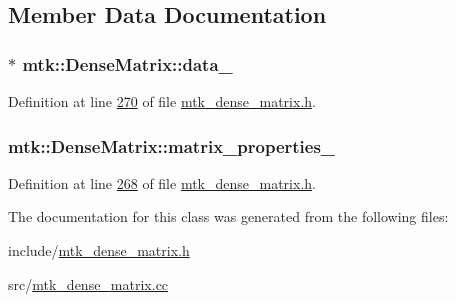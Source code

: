 \subsection{Member Data Documentation}
\hypertarget{classmtk_1_1DenseMatrix_a7893e4e5c8d2e2de32b156177e78cb6f}{
\subsubsection[{data\-\_\-}]{$\ast$ mtk\-::\-Dense\-Matrix\-::data\-\_\-\hspace{0.3cm}{\ttfamily [private]}}}\label{classmtk_1_1DenseMatrix_a7893e4e5c8d2e2de32b156177e78cb6f}


Definition at line \hyperlink{mtk__dense__matrix_8h_source_l00270}{270} of file \hyperlink{mtk__dense__matrix_8h_source}{mtk\-\_\-dense\-\_\-matrix.\-h}.

\hypertarget{classmtk_1_1DenseMatrix_a481c8d09af685a5ba67acefdcaa810cc}{
\subsubsection[{matrix\-\_\-properties\-\_\-}]{ mtk\-::\-Dense\-Matrix\-::matrix\-\_\-properties\-\_\-\hspace{0.3cm}{\ttfamily [private]}}}\label{classmtk_1_1DenseMatrix_a481c8d09af685a5ba67acefdcaa810cc}


Definition at line \hyperlink{mtk__dense__matrix_8h_source_l00268}{268} of file \hyperlink{mtk__dense__matrix_8h_source}{mtk\-\_\-dense\-\_\-matrix.\-h}.



The documentation for this class was generated from the following files\-:\begin{DoxyCompactItemize}
\item 
include/\hyperlink{mtk__dense__matrix_8h}{mtk\-\_\-dense\-\_\-matrix.\-h}\item 
src/\hyperlink{mtk__dense__matrix_8cc}{mtk\-\_\-dense\-\_\-matrix.\-cc}\end{DoxyCompactItemize}
